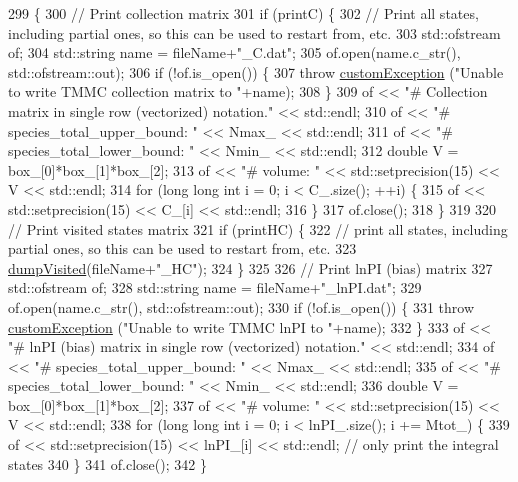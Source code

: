 \begin{DoxyCode}
299                                                                      \{
300     \textcolor{comment}{// Print collection matrix}
301     \textcolor{keywordflow}{if} (printC) \{
302         \textcolor{comment}{// Print all states, including partial ones, so this can be used to restart from, etc.}
303         std::ofstream of;
304         std::string name = fileName+\textcolor{stringliteral}{"\_C.dat"};
305         of.open(name.c\_str(), std::ofstream::out);
306         \textcolor{keywordflow}{if} (!of.is\_open()) \{
307             \textcolor{keywordflow}{throw} \hyperlink{classcustom_exception}{customException} (\textcolor{stringliteral}{"Unable to write TMMC collection matrix to "}+name);
308         \}
309         of << \textcolor{stringliteral}{"# Collection matrix in single row (vectorized) notation."} << std::endl;
310         of << \textcolor{stringliteral}{"# species\_total\_upper\_bound: "} << Nmax\_ << std::endl;
311         of << \textcolor{stringliteral}{"# species\_total\_lower\_bound: "} << Nmin\_ << std::endl;
312         \textcolor{keywordtype}{double} V = box\_[0]*box\_[1]*box\_[2];
313         of << \textcolor{stringliteral}{"# volume: "} << std::setprecision(15) << V << std::endl;
314         \textcolor{keywordflow}{for} (\textcolor{keywordtype}{long} \textcolor{keywordtype}{long} \textcolor{keywordtype}{int} i = 0; i < C\_.size(); ++i) \{
315             of << std::setprecision(15) << C\_[i] << std::endl;
316         \}
317         of.close();
318     \}
319 
320     \textcolor{comment}{// Print visited states matrix}
321     \textcolor{keywordflow}{if} (printHC) \{
322         \textcolor{comment}{// print all states, including partial ones, so this can be used to restart from, etc.}
323         \hyperlink{classtmmc_a295886d2f7a947a9de890bcb3adb51c7}{dumpVisited}(fileName+\textcolor{stringliteral}{"\_HC"});
324     \}
325 
326     \textcolor{comment}{// Print lnPI (bias) matrix}
327     std::ofstream of;
328     std::string name = fileName+\textcolor{stringliteral}{"\_lnPI.dat"};
329     of.open(name.c\_str(), std::ofstream::out);
330     \textcolor{keywordflow}{if} (!of.is\_open()) \{
331         \textcolor{keywordflow}{throw} \hyperlink{classcustom_exception}{customException} (\textcolor{stringliteral}{"Unable to write TMMC lnPI to "}+name);
332     \}
333     of << \textcolor{stringliteral}{"# lnPI (bias) matrix in single row (vectorized) notation."} << std::endl;
334     of << \textcolor{stringliteral}{"# species\_total\_upper\_bound: "} << Nmax\_ << std::endl;
335     of << \textcolor{stringliteral}{"# species\_total\_lower\_bound: "} << Nmin\_ << std::endl;
336     \textcolor{keywordtype}{double} V = box\_[0]*box\_[1]*box\_[2];
337     of << \textcolor{stringliteral}{"# volume: "} << std::setprecision(15) << V << std::endl;
338     \textcolor{keywordflow}{for} (\textcolor{keywordtype}{long} \textcolor{keywordtype}{long} \textcolor{keywordtype}{int} i = 0; i < lnPI\_.size(); i += Mtot\_) \{
339         of << std::setprecision(15) << lnPI\_[i] << std::endl; \textcolor{comment}{// only print the integral states}
340     \}
341     of.close();
342 \}
\end{DoxyCode}
